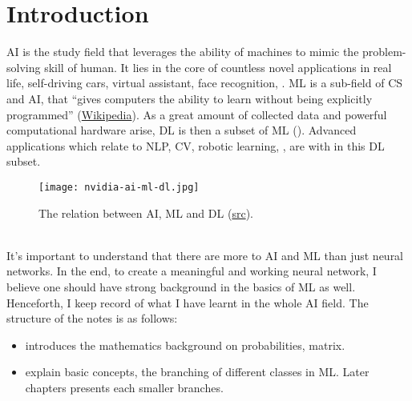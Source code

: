 \chapter{Introduction}

\ac{AI} is the study field that leverages the ability of machines to mimic the problem-solving skill of human. It lies in the core of countless novel applications in real life, self-driving cars, virtual assistant, face recognition, \etc. \ac{ML} is a sub-field of \ac{CS} and \ac{AI}, that “gives computers the ability to learn without being explicitly programmed” (\href{https://en.wikipedia.org/wiki/Machine_learning}{Wikipedia}). As a great amount of collected data and powerful computational hardware arise, \ac{DL} is then a subset of \ac{ML} (). Advanced applications which relate to \ac{NLP}, \ac{CV}, robotic learning, \etc, are with in this \ac{DL} subset.
\begin{figure}[hbt!]
	\centering
	\texttt{[image: nvidia-ai-ml-dl.jpg]}
	\caption{The relation between \ac{AI}, \ac{ML} and \ac{DL} (\href{https://developer.nvidia.com/deep-learning}{src}).}
	\label{fig:relation-ai-ml-dl}
\end{figure}

\\
It's important to understand that there are more to \ac{AI} and \ac{ML} than just neural networks. In the end, to create a meaningful and working neural network, I believe one should have strong background in the basics of \ac{ML} as well. Henceforth, I keep record of what I have learnt in the whole \ac{AI} field. The structure of the notes is as follows:
\begin{itemize}
	\item {} introduces the mathematics background on probabilities, matrix.
	\item {} explain basic concepts, the branching of different classes in \ac{ML}. Later chapters presents each smaller branches.
\end{itemize}